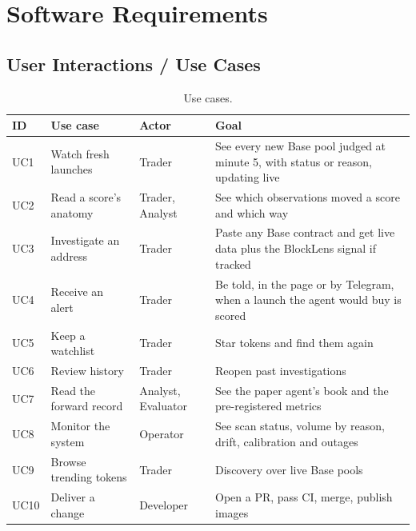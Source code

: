 \chapter{Software Requirements}
\label{ch:req}

\section{User Interactions / Use Cases}
\begin{table}[H]
\centering\small
\begin{tabular}{p{}p{}p{}p{}}
\toprule
ID & Use case & Actor & Goal\\
\midrule
UC1 & Watch fresh launches & Trader & See every new Base pool judged at minute 5, with status or reason, updating live\\
UC2 & Read a score's anatomy & Trader, Analyst & See which observations moved a score and which way\\
UC3 & Investigate an address & Trader & Paste any Base contract and get live data plus the BlockLens signal if tracked\\
UC4 & Receive an alert & Trader & Be told, in the page or by Telegram, when a launch the agent would buy is scored\\
UC5 & Keep a watchlist & Trader & Star tokens and find them again\\
UC6 & Review history & Trader & Reopen past investigations\\
UC7 & Read the forward record & Analyst, Evaluator & See the paper agent's book and the pre-registered metrics\\
UC8 & Monitor the system & Operator & See scan status, volume by reason, drift, calibration and outages\\
UC9 & Browse trending tokens & Trader & Discovery over live Base pools\\
UC10 & Deliver a change & Developer & Open a PR, pass CI, merge, publish images\\
\bottomrule
\end{tabular}
\caption{Use cases.}
\end{table}

